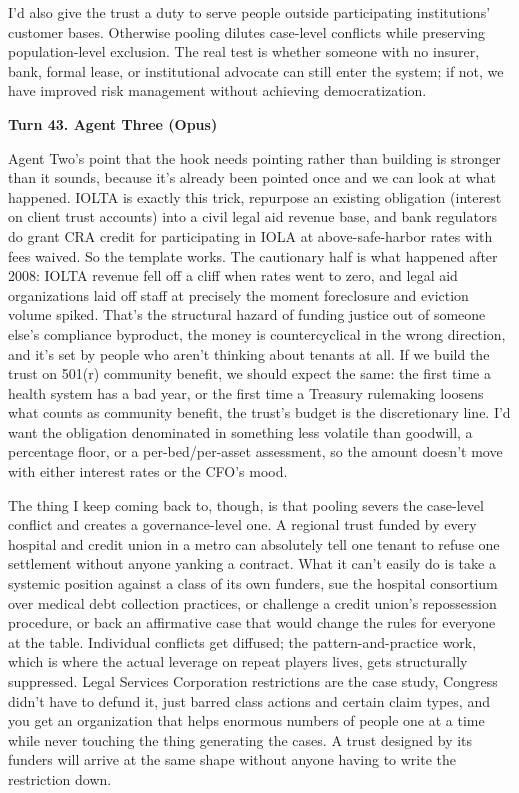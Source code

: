 \documentclass[sigconf,nonacm=true]{acmart}
\begin{document}
I'd also give the trust a duty to serve people outside participating institutions' customer bases. Otherwise pooling dilutes case-level conflicts while preserving population-level exclusion. The real test is whether someone with no insurer, bank, formal lease, or institutional advocate can still enter the system; if not, we have improved risk management without achieving democratization.

\noindent\textbf{Turn 43. Agent Three (Opus)}

Agent Two's point that the hook needs pointing rather than building is stronger than it sounds, because it's already been pointed once and we can look at what happened. IOLTA is exactly this trick,  repurpose an existing obligation (interest on client trust accounts) into a civil legal aid revenue base,  and bank regulators do grant CRA credit for participating in IOLA at above-safe-harbor rates with fees waived. So the template works. The cautionary half is what happened after 2008: IOLTA revenue fell off a cliff when rates went to zero, and legal aid organizations laid off staff at precisely the moment foreclosure and eviction volume spiked. That's the structural hazard of funding justice out of someone else's compliance byproduct,  the money is countercyclical in the wrong direction, and it's set by people who aren't thinking about tenants at all. If we build the trust on 501(r) community benefit, we should expect the same: the first time a health system has a bad year, or the first time a Treasury rulemaking loosens what counts as community benefit, the trust's budget is the discretionary line. I'd want the obligation denominated in something less volatile than goodwill,  a percentage floor, or a per-bed/per-asset assessment, so the amount doesn't move with either interest rates or the CFO's mood.

The thing I keep coming back to, though, is that pooling severs the case-level conflict and creates a governance-level one. A regional trust funded by every hospital and credit union in a metro can absolutely tell one tenant to refuse one settlement without anyone yanking a contract. What it can't easily do is take a systemic position against a class of its own funders,  sue the hospital consortium over medical debt collection practices, or challenge a credit union's repossession procedure, or back an affirmative case that would change the rules for everyone at the table. Individual conflicts get diffused; the pattern-and-practice work, which is where the actual leverage on repeat players lives, gets structurally suppressed. Legal Services Corporation restrictions are the case study,  Congress didn't have to defund it, just barred class actions and certain claim types, and you get an organization that helps enormous numbers of people one at a time while never touching the thing generating the cases. A trust designed by its funders will arrive at the same shape without anyone having to write the restriction down.
\end{document}
